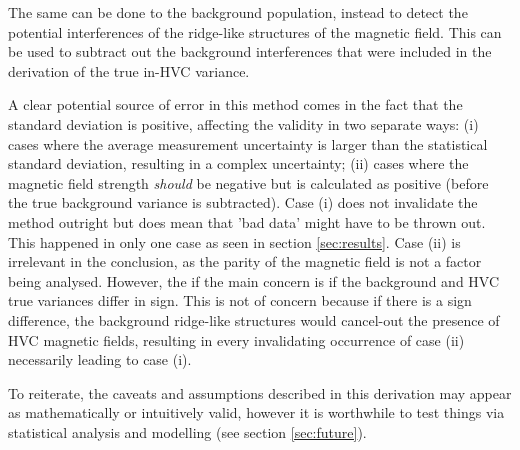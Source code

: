 The same can be done to the background population, instead to detect the potential interferences of the ridge-like structures of the magnetic field. This can be used to subtract out the background interferences that were included in the derivation of the true in-HVC variance.


A clear potential source of error in this method comes in the fact that the standard deviation is positive, affecting the validity in two separate ways: (i) cases where the average measurement uncertainty is larger than the statistical standard deviation, resulting in a complex uncertainty; (ii) cases where the magnetic field strength \textit{should} be negative but is calculated as positive (before the true background variance is subtracted). Case (i) does not invalidate the method outright but does mean that 'bad data' might have to be thrown out. This happened in only one case as seen in section \ref{sec:results}. Case (ii) is irrelevant in the conclusion, as the parity of the magnetic field is not a factor being analysed. However, the if the main concern is if the background and HVC true variances differ in sign. This is not of concern because if there is a sign difference, the background ridge-like structures would cancel-out the presence of HVC magnetic fields, resulting in every invalidating occurrence of case (ii) necessarily leading to case (i).


To reiterate, the caveats and assumptions described in this derivation may appear as mathematically or intuitively valid, however it is worthwhile to test things via statistical analysis and modelling (see section \ref{sec:future}).

%
%
%
%
%

